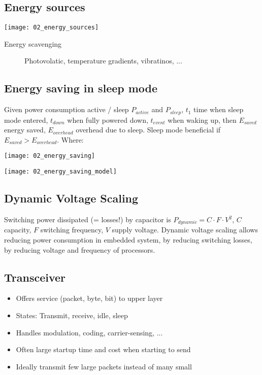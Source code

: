 \subsection{Energy sources}

\texttt{[image: 02\_energy\_sources]}

\begin{description}
		\item[Energy scavenging] Photovolatic, temperature gradients, vibratinos, ...
\end{description}

\subsection{Energy saving in sleep mode}

Given power consumption active / sleep $P_{active}$ and $P_{sleep}$, $t_1$ time
when sleep mode entered, $t_{down}$ when fully powered down, $t_{event}$ when
waking up, then $E_{saved}$ energy saved, $E_{overhead}$ overhead due to sleep.
Sleep mode beneficial if $E_{saved} > E_{overhead}$. Where:

\texttt{[image: 02\_energy\_saving]}

\texttt{[image: 02\_energy\_saving\_model]}

\subsection{Dynamic Voltage Scaling}

Switching power dissipated (= losses!) by capacitor is $P_{dynamic} = C \cdot F
\cdot V^2$, $C$ capacity, $F$ switching frequency, $V$ supply voltage. Dynamic
voltage scaling allows reducing power consumption in embedded system, by
reducing switching losses, by reducing voltage and frequency of processors.

\subsection{Transceiver}

\begin{itemize}
		\item Offers service (packet, byte, bit) to upper layer
		\item States: Transmit, receive, idle, sleep
		\item Handles modulation, coding, carrier-sensing, ...
		\item Often large startup time and cost when starting to send
		\item Ideally transmit few large packets instead of many small
\end{itemize}

